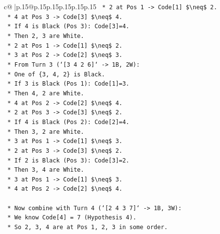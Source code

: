 \documentclass{article}
\begin{document}
{\begin{supertabular}{c@{$\;$}|p{.15\linewidth}@{}p{.15\linewidth}p{.15\linewidth}p{.15\linewidth}p{.15\linewidth}p{.15\linewidth}}
{{{\texttt{                *   2 at Pos 1 {-}> Code{[}1{]} \$\textbackslash{}neq\$ 2.} \\
\texttt{                *   4 at Pos 3 {-}> Code{[}3{]} \$\textbackslash{}neq\$ 4.} \\
\texttt{            *   If 4 is Black (Pos 3): Code{[}3{]}=4.} \\
\texttt{                *   Then 2, 3 are White.} \\
\texttt{                *   2 at Pos 1 {-}> Code{[}1{]} \$\textbackslash{}neq\$ 2.} \\
\texttt{                *   3 at Pos 2 {-}> Code{[}2{]} \$\textbackslash{}neq\$ 3.} \\
\texttt{        *   From Turn 3 (`{[}3 4 2 6{]}` {-}> 1B, 2W):} \\
\texttt{            *   One of \{3, 4, 2\} is Black.} \\
\texttt{            *   If 3 is Black (Pos 1): Code{[}1{]}=3.} \\
\texttt{                *   Then 4, 2 are White.} \\
\texttt{                *   4 at Pos 2 {-}> Code{[}2{]} \$\textbackslash{}neq\$ 4.} \\
\texttt{                *   2 at Pos 3 {-}> Code{[}3{]} \$\textbackslash{}neq\$ 2.} \\
\texttt{            *   If 4 is Black (Pos 2): Code{[}2{]}=4.} \\
\texttt{                *   Then 3, 2 are White.} \\
\texttt{                *   3 at Pos 1 {-}> Code{[}1{]} \$\textbackslash{}neq\$ 3.} \\
\texttt{                *   2 at Pos 3 {-}> Code{[}3{]} \$\textbackslash{}neq\$ 2.} \\
\texttt{            *   If 2 is Black (Pos 3): Code{[}3{]}=2.} \\
\texttt{                *   Then 3, 4 are White.} \\
\texttt{                *   3 at Pos 1 {-}> Code{[}1{]} \$\textbackslash{}neq\$ 3.} \\
\texttt{                *   4 at Pos 2 {-}> Code{[}2{]} \$\textbackslash{}neq\$ 4.} \\
\\ 
\texttt{        *   Now combine with Turn 4 (`{[}2 4 3 7{]}` {-}> 1B, 3W):} \\
\texttt{            *   We know Code{[}4{]} = 7 (Hypothesis 4).} \\
\texttt{            *   So 2, 3, 4 are at Pos 1, 2, 3 in some order.} \\
}}}
\end{supertabular}}
\end{document}
